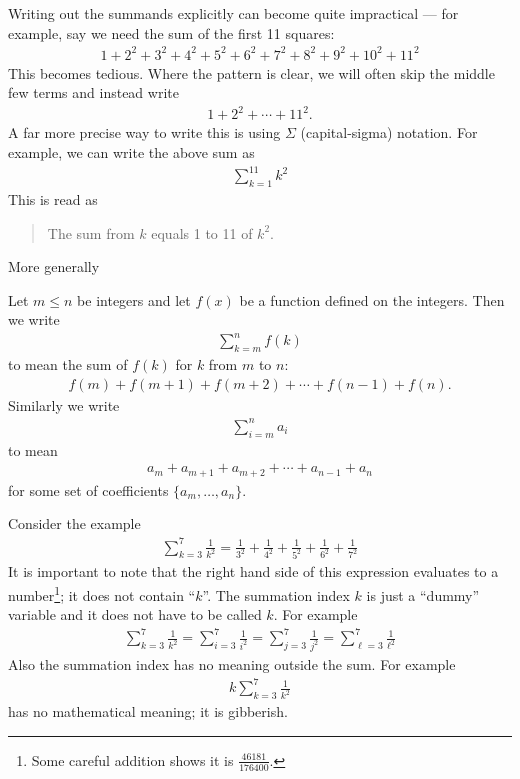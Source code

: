 Writing out the summands explicitly can become quite impractical --- for example, say we
need the sum of the first 11 squares:
\begin{align*}
  1 + 2^2 + 3^2 + 4^2+ 5^2 + 6^2 + 7^2 + 8^2 + 9^2 + 10^2 + 11^2
\end{align*}
This becomes tedious. Where the pattern is clear, we will often skip the middle few
terms and instead write
\begin{align*}
  1 + 2^2 + \cdots  + 11^2.
\end{align*}
A far more precise way to write this is using $\Sigma$ (capital-sigma) notation. For
example, we can write the above sum as
\begin{align*}
  \sum_{k=1}^{11} k^2
\end{align*}
This is read as
\begin{quote}
 The sum from $k$ equals 1 to 11 of $k^2$.
\end{quote}
More generally
\begin{notn}
Let $m\leq n$ be integers and let $f(x)$ be a function defined on the integers.
Then we write
\begin{align*}
  \sum_{k=m}^n f(k)
\end{align*}
to mean the sum of $f(k)$ for $k$ from $m$ to $n$:
\begin{align*}
  f(m) + f(m+1) + f(m+2) + \cdots + f(n-1) + f(n).
\end{align*}
Similarly we write
\begin{align*}
  \sum_{i=m}^n a_i
\end{align*}
to mean
\begin{align*}
  a_m+a_{m+1}+a_{m+2}+\cdots+a_{n-1}+a_n
\end{align*}
for some set of coefficients $\{ a_m, \ldots, a_n \}$.
\end{notn}

Consider the example
\begin{align*}
\sum_{k=3}^7 \frac{1}{k^2}=\frac{1}{3^2}+\frac{1}{4^2}+\frac{1}{5^2}+
\frac{1}{6^2}+\frac{1}{7^2}
\end{align*}
It is important to note that the right hand side of this expression evaluates to a
number\footnote{Some careful addition shows it is $\frac{46181}{176400}$.}; it does not
contain ``$k$''.  The summation index $k$  is just a ``dummy'' variable and
it does not have to be called $k$. For example
\begin{align*}
  \sum_{k=3}^7 \frac{1}{k^2}
  =\sum_{i=3}^7 \frac{1}{i^2}
  =\sum_{j=3}^7 \frac{1}{j^2}
  =\sum_{\ell=3}^7 \frac{1}{\ell^2}
\end{align*}
Also the summation index has no meaning outside the sum. For
example
\begin{align*}
k\sum_{k=3}^7 \frac{1}{k^2}
\end{align*}
has no mathematical meaning; it is gibberish.

